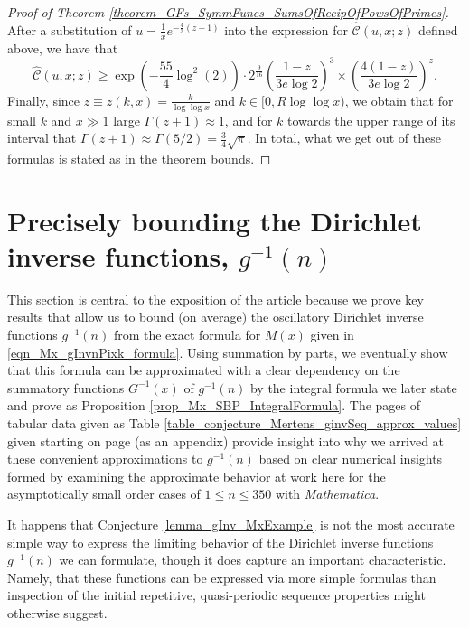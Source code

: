 \documentclass[11pt,reqno,a4letter]{article}
\numberwithin{figure}{section}
\numberwithin{table}{section}
\theoremstyle{plain}
\numberwithin{theorem}{section}
\theoremstyle{definition}
\begin{document}
\begin{proof}[Proof of Theorem \ref{theorem_GFs_SymmFuncs_SumsOfRecipOfPowsOfPrimes}]
After a substitution of $u = \frac{1}{x} e^{-\frac{4}{3}(z-1)}$ into the expression for 
$\widehat{\mathcal{C}}(u, x; z)$ defined above, we have that 
\[
\widehat{\mathcal{C}}(u, x; z) \geq \exp\left(-\frac{55}{4} \log^2(2)\right) \cdot 2^{\frac{9}{16}} 
     \left(\frac{1-z}{3e\log 2}\right)^3 \times \left(\frac{4(1-z)}{3e\log 2}\right)^z. 
\]
Finally, since $z \equiv z(k, x) = \frac{k}{\log\log x}$ and $k \in [0, R\log\log x)$, we obtain that 
for small $k$ and $x \gg 1$ large $\Gamma(z+1) \approx 1$, and for $k$ towards the upper range of 
its interval that $\Gamma(z+1) \approx \Gamma(5/2) = \frac{3}{4} \sqrt{\pi}$. 
In total, what we get out of these formulas is stated as in the theorem bounds. 
\end{proof} 

\newpage
\section{Precisely bounding the Dirichlet inverse functions, $g^{-1}(n)$} 
\label{Section_InvFunc_PreciseExpsAndAsymptotics} 

This section is central to the exposition of the article because we prove key results that allow us to 
bound (on average) the oscillatory 
Dirichlet inverse functions $g^{-1}(n)$ from the exact formula for $M(x)$ given in 
\eqref{eqn_Mx_gInvnPixk_formula}. 
Using summation by parts, we eventually show that this formula can be approximated with a clear 
dependency on the summatory functions $G^{-1}(x)$ of $g^{-1}(n)$ by the integral formula we later 
state and prove as Proposition \ref{prop_Mx_SBP_IntegralFormula}. 
The pages of tabular data given as Table \ref{table_conjecture_Mertens_ginvSeq_approx_values} 
given starting on page \pageref{table_conjecture_Mertens_ginvSeq_approx_values} (as an appendix) 
provide insight into why we arrived at these convenient approximations to $g^{-1}(n)$ based on 
clear numerical insights formed by examining the approximate behavior 
at work here for the asymptotically 
small order cases of $1 \leq n \leq 350$ with \emph{Mathematica}. 

It happens that Conjecture \ref{lemma_gInv_MxExample} is not the most accurate 
simple way to express the limiting behavior of the 
Dirichlet inverse functions $g^{-1}(n)$ we can formulate, 
though it does capture an important characteristic. Namely, that these 
functions can be expressed via more simple formulas than inspection of the initial 
repetitive, quasi-periodic sequence properties might otherwise suggest. 
\end{document}

